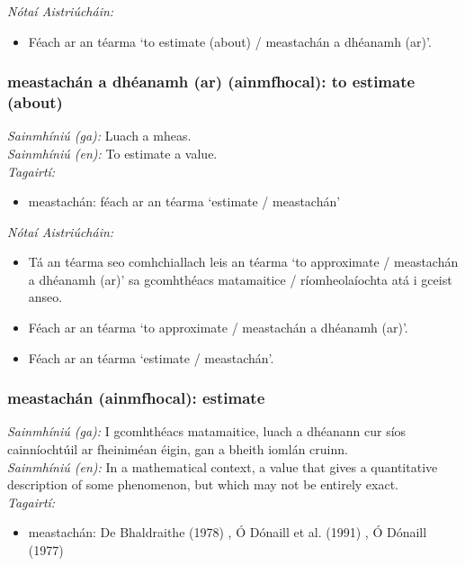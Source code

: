 \documentclass{article}
\begin{document}
 \noindent \textit{Nótaí Aistriúcháin:}
\begin{itemize}
	\item Féach ar an téarma `to estimate (about) / meastachán a dhéanamh (ar)'.
\end{itemize}


\subsubsection*{meastachán a dhéanamh (ar) (ainmfhocal): to estimate (about)}
 \noindent \textit{Sainmhíniú (ga):} Luach a mheas.
\\
 \noindent \textit{Sainmhíniú (en):} To estimate a value.
\\
 \noindent \textit{Tagairtí:}
\begin{itemize}
	\item meastachán: féach ar an téarma `estimate / meastachán'
\end{itemize}

 \noindent \textit{Nótaí Aistriúcháin:}
\begin{itemize}
	\item Tá an téarma seo comhchiallach leis an téarma `to approximate / meastachán a dhéanamh (ar)' sa gcomhthéacs matamaitice / ríomheolaíochta atá i gceist anseo.
	\item Féach ar an téarma `to approximate / meastachán a dhéanamh (ar)'.
	\item Féach ar an téarma `estimate / meastachán'.
\end{itemize}


\subsubsection*{meastachán (ainmfhocal): estimate}
 \noindent \textit{Sainmhíniú (ga):} I gcomhthéacs matamaitice, luach a dhéanann cur síos cainníochtúil ar fheiniméan éigin, gan a bheith iomlán cruinn.
\\
 \noindent \textit{Sainmhíniú (en):} In a mathematical context, a value that gives a quantitative description of some phenomenon, but which may not be entirely exact.
\\
 \noindent \textit{Tagairtí:}
\begin{itemize}
	\item meastachán: De Bhaldraithe (1978) \cite{de-bhaldraithe}, Ó Dónaill et al. (1991) \cite{focloir-beag}, Ó Dónaill (1977) \cite{odonaill}
\end{itemize}
\end{document}
